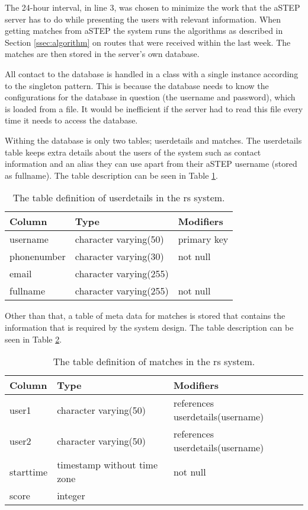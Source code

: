 The 24-hour interval, in line 3, was chosen to minimize the work that the aSTEP server has to do while presenting the users with relevant information.
When getting matches from aSTEP the system runs the algorithms as described in Section \ref{ssec:algorithm} on routes that were received within the last week.
The matches are then stored in the server's own database.

All contact to the database is handled in a class with a single instance according to the singleton pattern. 
This is because the database needs to know the configurations for the database in question (the username and password), which is loaded from a file.
It would be inefficient if the server had to read this file every time it needs to access the database.

Withing the database is only two tables; userdetails and matches.
The userdetails table keeps extra details about the users of the system such as contact information and an alias they can use apart from their aSTEP username (stored as fullname).
The table description can be seen in Table \ref{tab:userdetails}.

\begin{table}[h]
	\centering
	\begin{tabular}{l|l|l}
		Column 		& Type                   & Modifiers\\\hline
		username    & character varying(50)  & primary key\\
		phonenumber & character varying(30)  & not null\\
		email       & character varying(255) &\\
		fullname    & character varying(255) & not null\\
	\end{tabular}
	\caption{The table definition of userdetails in the \gls{rs} system.}
	\label{tab:userdetails}
\end{table}

Other than that, a table of meta data for matches is stored that contains the information that is required by the system design.
The table description can be seen in Table \ref{tab:matches}.

\begin{table}[h]
	\centering
	\begin{tabular}{l|l|l}
			   Column  &            Type             & Modifiers\\\hline
			 user1     & character varying(50)       & references userdetails(username)\\
			 user2     & character varying(50)       & references userdetails(username)\\
			 starttime & timestamp without time zone & not null\\
			 score     & integer                     &
	\end{tabular}
	\caption{The table definition of matches in the \gls{rs} system.}
	\label{tab:matches}
\end{table}
